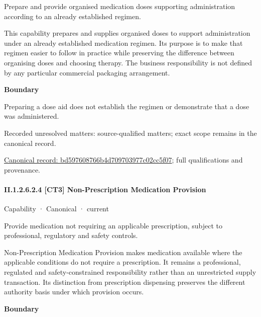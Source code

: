 Prepare and provide organised medication doses supporting administration according to an already established regimen.



This capability prepares and supplies organised doses to support administration under an already established medication regimen. Its purpose is to make that regimen easier to follow in practice while preserving the difference between organising doses and choosing therapy. The business responsibility is not defined by any particular commercial packaging arrangement.



\textbf{Boundary}



Preparing a dose aid does not establish the regimen or demonstrate that a dose was administered.


{\small Recorded unresolved matters: source-qualified matters; exact scope remains in the canonical record.}\par
{\footnotesize \href{../../../../continuum/strategy/capability/bd597608766b4d709703977c02cc5f07.md}{Canonical record: bd597608766b4d709703977c02cc5f07}; full qualifications and provenance.}\par
\paragraph*{II.1.2.6.2.4 [CT3] Non-Prescription Medication Provision}
\label{navigation:II.1.2.6.2.4}

\label{element:7bbe4810fb974a8ab6d47b30d6475df3}
{\small Capability · Canonical · current}\par

Provide medication not requiring an applicable prescription, subject to professional, regulatory and safety controls.



Non-Prescription Medication Provision makes medication available where the applicable conditions do not require a prescription. It remains a professional, regulated and safety-constrained responsibility rather than an unrestricted supply transaction. Its distinction from prescription dispensing preserves the different authority basis under which provision occurs.



\textbf{Boundary}



